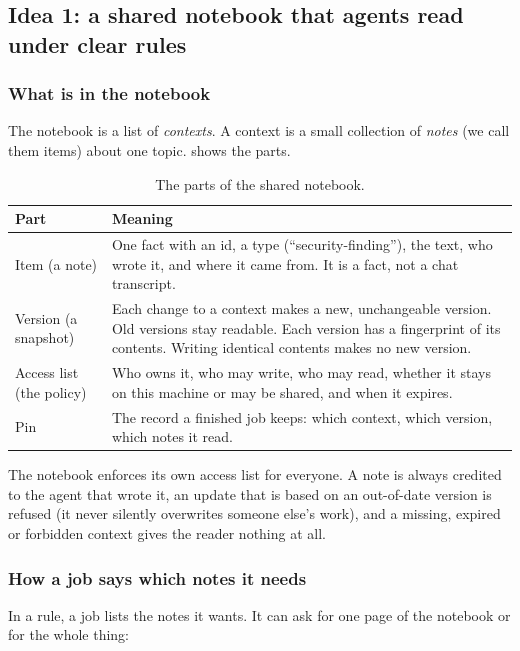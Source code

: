 \documentclass[10pt,a4paper]{article}
\begin{document}
\subsection{Idea 1: a shared notebook that agents read under clear rules}

\subsubsection*{What is in the notebook}

The notebook is a list of \emph{contexts}. A context is a small collection of \emph{notes} (we call them
items) about one topic.  shows the parts.

\begin{table}[h]
\centering\small
\caption{The parts of the shared notebook.}
\label{tab:notebook}
\begin{tabularx}{\textwidth}{@{}l X@{}}
\toprule
Part & Meaning \\
\midrule
Item (a note) & One fact with an id, a type (``security-finding''), the text, who wrote it, and where it came from.
  It is a fact, not a chat transcript. \\
Version (a snapshot) & Each change to a context makes a new, unchangeable version. Old versions stay readable. Each
  version has a fingerprint of its contents. Writing identical contents makes no new version. \\
Access list (the policy) & Who owns it, who may write, who may read, whether it stays on this machine or may be
  shared, and when it expires. \\
Pin & The record a finished job keeps: which context, which version, which notes it read. \\
\bottomrule
\end{tabularx}
\end{table}

The notebook enforces its own access list for everyone. A note is always credited to the agent that wrote it,
an update that is based on an out-of-date version is refused (it never silently overwrites someone else's
work), and a missing, expired or forbidden context gives the reader nothing at all.

\subsubsection*{How a job says which notes it needs}

In a rule, a job lists the notes it wants. It can ask for one page of the notebook or for the whole thing:
\end{document}
